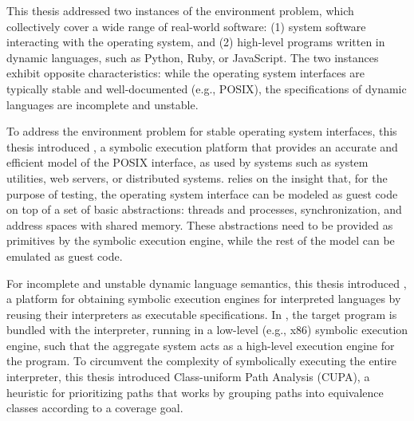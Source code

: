 This thesis addressed two instances of the environment problem, which collectively cover a wide range of real-world software: (1) system software interacting with the operating system, and (2) high-level programs written in dynamic languages, such as Python, Ruby, or JavaScript.  The two instances exhibit opposite characteristics: while the operating system interfaces are typically stable and well-documented (e.g., POSIX), the specifications of dynamic languages are incomplete and unstable.

To address the environment problem for stable operating system interfaces, this thesis introduced \emph{\cnine}, a symbolic execution platform that provides an accurate and efficient model of the POSIX interface, as used by systems such as system utilities, web servers, or distributed systems.
%
\cnine relies on the insight that, for the purpose of testing, the operating system interface can be modeled as guest code on top of a set of basic abstractions: threads and processes, synchronization, and address spaces with shared memory. These abstractions need to be provided as primitives by the symbolic execution engine, while the rest of the model can be emulated as guest code.

For incomplete and unstable dynamic language semantics, this thesis introduced \emph{\chef}, a platform for obtaining symbolic execution engines for interpreted languages by reusing their interpreters as executable specifications.  In \chef, the target program is bundled with the interpreter, running in a low-level (e.g., x86) symbolic execution engine, such that the aggregate system acts as a high-level execution engine for the program.
%
%
To circumvent the complexity of symbolically executing the entire interpreter, this thesis introduced Class-uniform Path Analysis (CUPA), a heuristic for prioritizing paths that works by grouping paths into equivalence classes according to a coverage goal.


